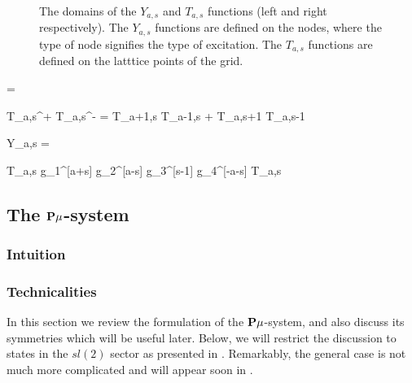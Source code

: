 \begin{figure}[t]
\label{fig:yt_hooks}
\caption{The domains of the $Y_{a,s}$ and $T_{a,s}$ functions (left and right respectively). The $Y_{a,s}$ functions are defined on the nodes, where the type of node signifies the type of excitation. The $T_{a,s}$ functions are defined on the latttice points of the grid.}
\end{figure}

\beq
	 = 
\eeq



\beq
	T_{a,s}^+ T_{a,s}^- = T_{a+1,s} T_{a-1,s} + T_{a,s+1} T_{a,s-1} 
\eeq

\beq
	Y_{a,s} = 
\eeq

\beq
	T_{a,s} \rightarrow g_1^{[a+s]} g_2^{[a-s]} g_3^{[s-1]} g_4^{[-a-s]} \; T_{a,s}
\eeq




\subsection{The ${\bf P}\mu$-system}
\label{sec:pmu_system}

\subsubsection{Intuition}

\subsubsection{Technicalities}


In this section we review the formulation of the ${\bf P}\mu$-system, and also discuss its symmetries which will be useful later.
Below, we will restrict the discussion to states in the $sl(2)$ sector as presented in \cite{Gromov:2013pga}.
Remarkably, the general case is not much more complicated and will appear soon in \cite{Gromov:2014caa}.

